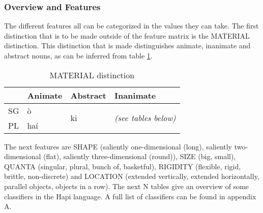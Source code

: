 \documentclass[a4paper, 12pt, oneside]{memoir}
\begin{document}
\subsubsection{Overview and Features}
The different features all can be categorized in the values they can take. The first distinction that is to be made outside of the feature matrix is the MATERIAL distinction. This distinction that is made distinguishes animate, inanimate and abstract nouns, as can be inferred from table \ref{t:clmaterial}.
\begin{table}[H]
\begin{centering}
\begin{tabular}{@{}llll@{}}
\toprule
   & Animate & Abstract            & Inanimate                           \\ \midrule
SG & ò      & \multirow{2}{*}{ki} & \multirow{2}{*}{\textit{(see tables below)}} \\
PL & haí     &                     &                                     \\ \bottomrule
\end{tabular}
\caption{MATERIAL distinction}
\label{t:clmaterial}
\end{centering}
\end{table}
The next features are SHAPE (saliently one-dimensional (long), saliently two-dimensional (flat), saliently three-dimensional (round)), SIZE (big, small), QUANTA (singular, plural, bunch of, basketful), RIGIDITY (flexible, rigid, brittle, non-discrete) and LOCATION (extended vertically, extended horizontally, parallel objects, objects in a row). The next N tables give an overview of some classifiers in the Hapi language. A full list of classifiers can be found in appendix A.
\end{document}

